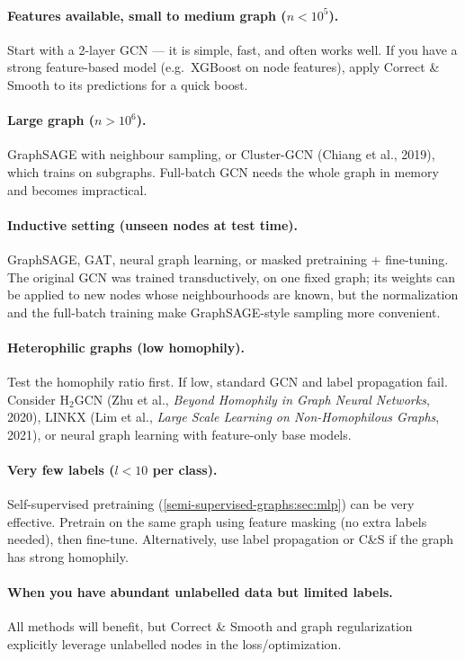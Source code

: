 \begin{notechapter}
\paragraph{Features available, small to medium graph ($n < 10^5$).}
Start with a 2-layer GCN --- it is simple, fast, and often works well.
If you have a strong feature-based model (e.g.\ XGBoost on node features),
apply Correct \& Smooth to its predictions for a quick boost.

\paragraph{Large graph ($n > 10^6$).}
GraphSAGE with neighbour sampling, or Cluster-GCN (Chiang et al., 2019), which trains on subgraphs. Full-batch GCN needs the whole graph in memory and becomes impractical.

\paragraph{Inductive setting (unseen nodes at test time).}
GraphSAGE, GAT, neural graph learning, or masked pretraining + fine-tuning.
The original GCN was trained transductively, on one fixed graph; its weights can be applied to new nodes whose neighbourhoods are known, but the normalization and the full-batch training make GraphSAGE-style sampling more convenient.

\paragraph{Heterophilic graphs (low homophily).}
Test the homophily ratio first. If low, standard GCN and label propagation fail.
Consider H$_2$GCN (Zhu et al., \emph{Beyond Homophily in Graph Neural Networks}, 2020), LINKX (Lim et al., \emph{Large Scale Learning on Non-Homophilous Graphs}, 2021), or
neural graph learning with feature-only base models.

\paragraph{Very few labels ($l < 10$ per class).}
Self-supervised pretraining (\cref{semi-supervised-graphs:sec:mlp}) can be very effective.
Pretrain on the same graph using feature masking (no extra labels needed),
then fine-tune. Alternatively, use label propagation or C\&S if the graph
has strong homophily.

\paragraph{When you have abundant unlabelled data but limited labels.}
All methods will benefit, but Correct \& Smooth and graph regularization
explicitly leverage unlabelled nodes in the loss/optimization.


\end{notechapter}
